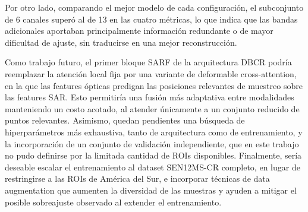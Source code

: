 Por otro lado, comparando el mejor modelo de cada configuración, el subconjunto de 6 canales superó al de 13 en las cuatro métricas, lo que indica que las bandas adicionales aportaban principalmente información redundante o de mayor dificultad de ajuste, sin traducirse en una mejor reconstrucción.


Como trabajo futuro, el primer bloque SARF de la arquitectura DBCR podría reemplazar la atención local fija por una variante de deformable cross-attention, en la que las features ópticas predigan las posiciones relevantes de muestreo sobre las features SAR. Esto permitiría una fusión más adaptativa entre modalidades manteniendo un costo acotado, al atender únicamente a un conjunto reducido de puntos relevantes. Asimismo, quedan pendientes una búsqueda de hiperparámetros más exhaustiva, tanto de arquitectura como de entrenamiento, y la incorporación de un conjunto de validación independiente, que en este trabajo no pudo definirse por la limitada cantidad de ROIs disponibles. Finalmente, sería deseable escalar el entrenamiento al dataset SEN12MS-CR completo, en lugar de restringirse a las ROIs de América del Sur, e incorporar técnicas de data augmentation que aumenten la diversidad de las muestras y ayuden a mitigar el posible sobreajuste observado al extender el entrenamiento.